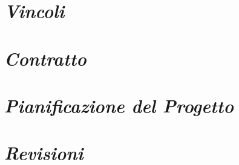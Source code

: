 \documentclass{article}
\begin{document}
\section{\itshape{Vincoli}}



\section{\itshape{Contratto}}


\section{\itshape{Pianificazione del Progetto}}



\section{\itshape{Revisioni}}

\end{document}

